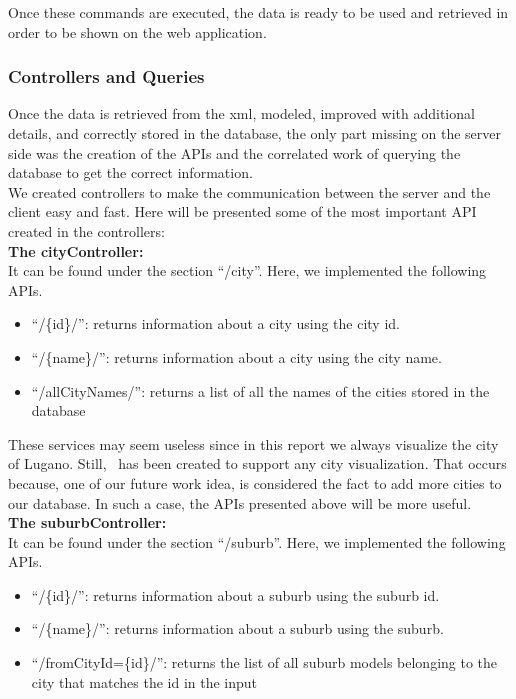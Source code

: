 Once these commands are executed, the data is ready to be used and retrieved in order to be shown on the web application.
\subsubsection{Controllers and Queries}
Once the data is retrieved from the xml, modeled, improved with additional details, and correctly stored in the database, the only part missing on the server side was the creation of the APIs and the correlated work of querying the database to get the correct information.\\

We created controllers to make the communication between the server and the client easy and fast. Here will be presented some of the most important API created in the controllers:\\
 
{\bf The cityController:}\\
It can be found under the section ``/city''. Here, we implemented the following APIs.
\begin{itemize}
	\item ``/\{id\}/'': returns information about a city using the city id.
	\item ``/\{name\}/'': returns information about a city using the city name.
	\item ``/allCityNames/'':  returns a list of all the names of the cities stored in the database
\end{itemize}
These services may seem useless since in this report we always visualize the city of Lugano. Still, \applicationName\ has been created to support any city visualization. That occurs because, one of our future work idea, is considered the fact to add more cities to our database. In such a case, the APIs presented above will be more useful.\\

{\bf The suburbController:}\\
It can be found under the section ``/suburb''. Here, we implemented the following APIs.
\begin{itemize}
	\item ``/\{id\}/'':  returns information about a suburb using the suburb id.
	\item ``/\{name\}/'':  returns information about a suburb using the suburb.
	\item ``/fromCityId=\{id\}/'': returns the list of all suburb models belonging to the city that matches the id in the input
\end{itemize}

